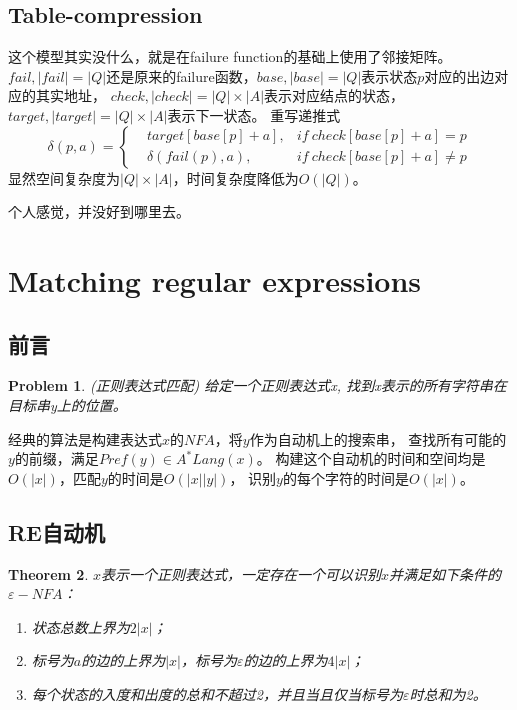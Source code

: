 \documentclass[UTF8]{ctexart}
\newtheorem{thm}{Theorem}[subsection]
\newtheorem{prob}[thm]{Problem}
\theoremstyle{definition}
\theoremstyle{remark}
\numberwithin{equation}{subsection}
\begin{document}
\subsection{Table-compression}

	这个模型其实没什么，就是在failure function的基础上使用了邻接矩阵。
	$fail, |fail|=|Q|$还是原来的failure函数，$base, |base|=|Q|$表示状态$p$对应的出边对应的其实地址，
	$check, |check|=|Q|\times|A|$表示对应结点的状态，$target, |target|=|Q|\times|A|$表示下一状态。
	重写递推式
	\[
		\delta(p, a) =
		\left\{
		\begin{aligned}
			&target[base[p]+a], 	&if\ check[base[p]+a] = p		\\
			&\delta(fail(p), a),	&if\ check[base[p]+a] \neq p
		\end{aligned}
		\right .
	\]
	显然空间复杂度为$|Q| \times |A|$，时间复杂度降低为$O(|Q|)$。
	
	个人感觉，并没好到哪里去。
	
\section{Matching regular expressions}

\subsection{前言}

    \begin{prob}
        (正则表达式匹配) 给定一个正则表达式x, 找到x表示的所有字符串在目标串y上的位置。
    \end{prob}
	经典的算法是构建表达式$x$的$NFA$，将$y$作为自动机上的搜索串，
	查找所有可能的$y$的前缀，满足$Pref(y) \in A^*Lang(x)$。
	构建这个自动机的时间和空间均是$O(|x|)$，匹配$y$的时间是$O(|x||y|)$，
	识别$y$的每个字符的时间是$O(|x|)$。
	
\subsection{RE自动机}

	\begin{thm} $x$表示一个正则表达式，一定存在一个可以识别$x$并满足如下条件的$\varepsilon-NFA$：
		\begin{enumerate}[(1)]
		
			\item 状态总数上界为$2|x|$；
			
			\item 标号为$a$的边的上界为$|x|$，标号为$\varepsilon$的边的上界为$4|x|$；
			
			\item 每个状态的入度和出度的总和不超过2，并且当且仅当标号为$\varepsilon$时总和为2。
			
		\end{enumerate}
	\end{thm}
	
\end{document}
